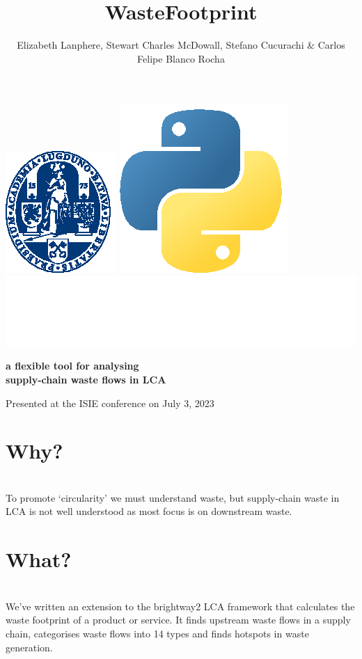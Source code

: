 \documentclass[a0paper,fleqn]{betterposter}
\begin{document}
{{\begin{minipage}{0.5\textwidth}
\begin{flushleft}
        \end{flushleft}
        \vspace{100pt}
        \end{minipage}
        \includegraphics[height=0.08\textwidth]{img/logoUL_white}\hfill
        \includegraphics[height=0.07\textwidth]{img/python}\hfill
        \includegraphics[height=0.07\textwidth]{img/brightway}

    }{
    }
    }{

    \title{WasteFootprint}
    {\selectfont\textbf{a flexible tool for analysing\\ supply-chain waste flows in LCA}}\\

    \author{Elizabeth Lanphere, Stewart Charles McDowall, Stefano Cucurachi \& Carlos Felipe Blanco Rocha}
    {\fontsize{35}{10}\selectfont Presented at the ISIE conference on July 3, 2023}
    
    \section{\hspace{2cm}Why?}\\
    To promote `circularity' we must understand waste, but supply-chain waste in LCA is not well understood as most focus is on downstream waste.

    \section{\hspace{2cm}What?}\\
    We've written an extension to the brightway2 LCA framework that calculates the waste footprint of a product or service.
    It finds upstream waste flows in a supply chain, categorises waste flows into 14 types and finds hotspots in waste generation.

}
\end{document}
